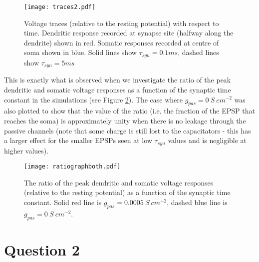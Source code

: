 \documentclass[paper=a4, fontsize=11pt]{scrartcl} %
\numberwithin{equation}{section} %
\numberwithin{figure}{section} %
\numberwithin{table}{section} %
\begin{document}
\begin{figure}[!h]
\centering
\texttt{[image: traces2.pdf]}
  \caption{Voltage traces (relative to the resting potential) with respect to time. Dendritic response recorded at synapse site (halfway along the dendrite) shown in red. Somatic responses recorded at centre of soma shown in blue. Solid lines show $\tau_{syn}=0.1 ms$, dashed lines show $\tau_{syn}=5 ms$ }
  \label{fig:vtracegraph}
\end{figure}


This is exactly what is observed when we investigate the ratio of the peak dendritic and somatic voltage responses as a function of the synaptic time constant in the simulations (see Figure \ref{fig:ratiograph}). The case where $g_{pas}=0~ S~cm^{-2}$ was also plotted to show that the value of the ratio (i.e. the fraction of the EPSP that reaches the soma) is approximately unity when there is no leakage through the passive channels (note that some charge is still lost to the capacitators - this has a larger effect for the smaller EPSPs seen at low $\tau_{syn}$ values and is negligible at higher values).\\

\begin{figure}[!h]
\centering
\texttt{[image: ratiographboth.pdf]}
  \caption{The ratio of the peak dendritic and somatic voltage responses (relative to the resting potential) as a function of the synaptic time constant. Solid red line is $g_{pas}=0.0005~ S~cm^{-2} $, dashed blue line is $g_{pas}=0~ S~cm^{-2} $. }
  \label{fig:ratiograph}
\end{figure}


\newpage
\section{\textbf{Question 2}}

\\
\\
\end{document}
